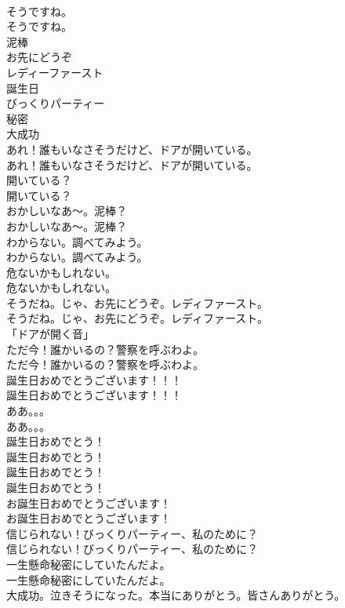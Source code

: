 \documentclass[8pt]{extreport}
\begin{document}
\begin{CJK}{UTF8}{min}
\\	そうですね。	
\\	そうですね。 
\\	泥棒
\\	お先にどうぞ
\\	レディーファースト
\\	誕生日
\\	びっくりパーティー
\\	秘密
\\	大成功
\\	あれ！誰もいなさそうだけど、ドアが開いている。	
\\	あれ！誰もいなさそうだけど、ドアが開いている。 
\\	開いている？	
\\	開いている？ 
\\	おかしいなあ～。泥棒？	
\\	おかしいなあ～。泥棒？ 
\\	わからない。調べてみよう。	
\\	わからない。調べてみよう。 
\\	危ないかもしれない。	
\\	危ないかもしれない。 
\\	そうだね。じゃ、お先にどうぞ。レディファースト。	
\\	そうだね。じゃ、お先にどうぞ。レディファースト。 
\\	「ドアが開く音」	
\\	ただ今！誰かいるの？警察を呼ぶわよ。	
\\	ただ今！誰かいるの？警察を呼ぶわよ。 
\\	誕生日おめでとうございます！！！	
\\	誕生日おめでとうございます！！！ 
\\	ああ。。。	
\\	ああ。。。 
\\	誕生日おめでとう！	
\\	誕生日おめでとう！ 
\\	誕生日おめでとう！	
\\	誕生日おめでとう！ 
\\	お誕生日おめでとうございます！	
\\	お誕生日おめでとうございます！ 
\\	信じられない！びっくりパーティー、私のために？	
\\	信じられない！びっくりパーティー、私のために？ 
\\	一生懸命秘密にしていたんだよ。	
\\	一生懸命秘密にしていたんだよ。 
\\	大成功。泣きそうになった。本当にありがとう。皆さんありがとう。	

\end{CJK}
\end{document}
